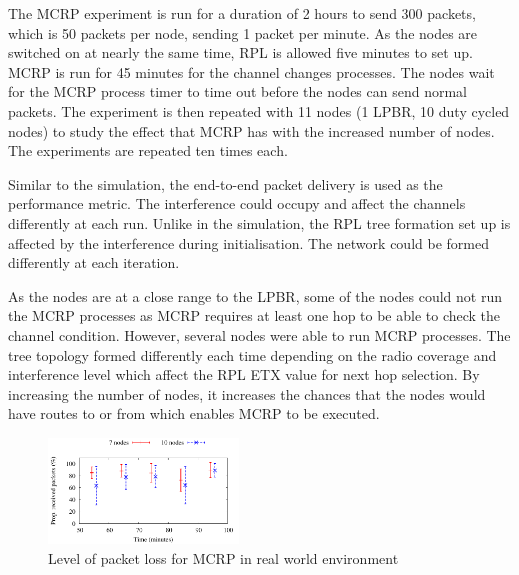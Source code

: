 The MCRP experiment is run for a duration of 2 hours to send 300 packets, which is 50 packets per node, sending 1 packet per minute. As the nodes are switched on at nearly the same time, RPL is allowed five minutes to set up. MCRP is run for 45 minutes for the channel changes processes. The nodes wait for the MCRP process timer to time out before the nodes can send normal packets. The experiment is then repeated with 11 nodes (1 LPBR, 10 duty cycled nodes) to study the effect that MCRP has with the increased number of nodes. The experiments are repeated ten times each. %



Similar to the simulation, the end-to-end packet delivery is used as the performance metric.
The interference could occupy and affect the channels differently at each run. Unlike in the simulation, the RPL tree formation set up is affected by the interference during initialisation. The network could be formed differently at each iteration.

As the nodes are at a close range to the LPBR, some of the nodes could not run the MCRP processes as MCRP requires at least one hop to be able to check the channel condition. However, several nodes were able to run MCRP processes. The tree topology formed differently each time depending on the radio coverage and interference level which affect the RPL ETX value for next hop selection. By increasing the number of nodes, it increases the chances that the nodes would have routes to or from which enables MCRP to be executed.

\begin{figure}
\centering
\includegraphics[width=0.45\textwidth]{figures/allNodes.pdf}
\caption{Level of packet loss for MCRP in real world environment}
\label{fig:hardware}
\end{figure}

